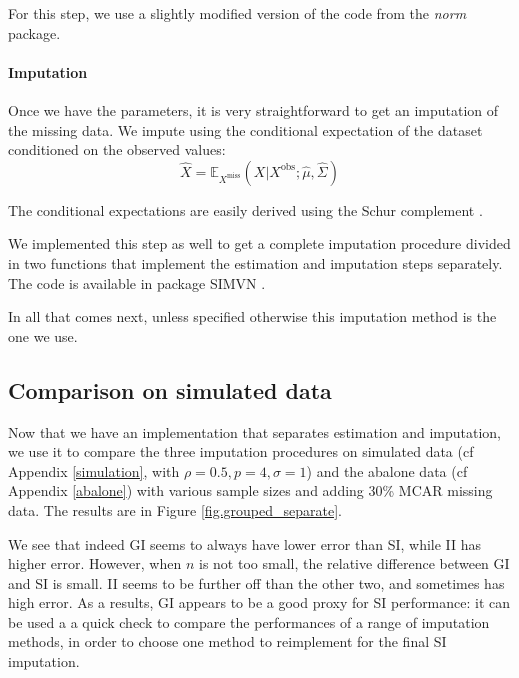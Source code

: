  For this step, we use a slightly modified version of the code from the \emph{norm} package.

\paragraph{Imputation}
Once we have the parameters, it is very straightforward to get an imputation of the missing data. We impute using the conditional expectation of the dataset conditioned on the observed values: 
$$\hat{X} = \mathbb{E}_{X^{\text{miss}}}(X \vert X^{\text{obs}} ; \hat{\mu}, \hat{\Sigma})$$

The conditional expectations are easily derived using the Schur complement \cite{norm_schur}.

We implemented this step as well to get a complete imputation procedure divided in two functions that implement the estimation and imputation steps separately. The code is available in package SIMVN \cite{SIMVN_github}.

In all that comes next, unless specified otherwise this imputation method is the one we use.
		\subsection{Comparison on simulated data}
Now that we have an implementation that separates estimation and imputation, we use it to compare the three imputation procedures on simulated data (cf Appendix \ref{simulation}, with $\rho=0.5, p=4, \sigma=1$) and the abalone data (cf Appendix \ref{abalone}) with various sample sizes and adding 30\% MCAR missing data. The results are in Figure \ref{fig.grouped_separate}.


	
We see that indeed GI seems to always have lower error than SI, while II has higher error. However, when $n$ is not too small, the relative difference between GI and SI is small. II seems to be further off than the other two, and sometimes has high error. As a results, GI appears to be a good proxy for SI performance: it can be used a a quick check to compare the performances of a range of imputation methods, in order to choose one method to reimplement for the final SI imputation.
